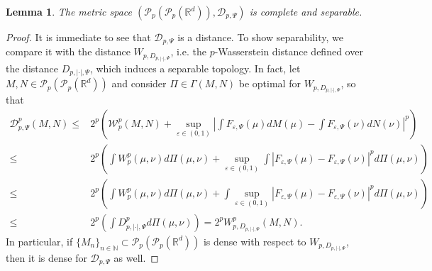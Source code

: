 \documentclass[10pt,leqno]{amsart}
\numberwithin{equation}{section}
\newtheorem{lemma}[teorema]{Lemma}
\newcommand{\R}{\mathbb{R}}
\newcommand{\N}{\mathbb{N}}
\newcommand{\PP}{\mathcal{P}}
\begin{document}
\begin{lemma}
    The metric space $(\PP_p(\PP_p(\R^d)),\mathcal{D}_{p,\Psi})$ is complete and separable.
\end{lemma}
\begin{proof}
    It is immediate to see that $\mathcal{D}_{p,\Psi} $ is a distance. To show separability, we compare it with the distance $W_{p,D_{p,|\cdot|,\Psi}}$, i.e. the $p$-Wasserstein distance defined over the distance $D_{p,|\cdot|,\Psi}$, which induces a separable topology. In fact, let $M,N\in \PP_p(\PP_p(\R^d))$ and consider $\Pi\in \Gamma(M,N)$ be optimal for $W_{p,D_{p,|\cdot|,\Psi}}$, so that 
    \begin{align*}
        \mathcal{D}_{p,\Psi}^p(M,N) \leq & 2^p\left( \mathcal{W}_p^p(M,N) + \sup_{\varepsilon\in(0,1)} \left|\int F_{\varepsilon,\Psi}(\mu) dM(\mu) - \int F_{\varepsilon,\Psi}(\nu) dN(\nu)\right|^p  \right)
        \\
        \leq & 2^p\left( \int W_p^p(\mu,\nu) d\Pi(\mu,\nu) + \sup_{\varepsilon\in(0,1)} \int \left|F_{\varepsilon,\Psi}(\mu) - F_{\varepsilon,\Psi}(\nu) \right|^p d\Pi(\mu,\nu) \right)
        \\
        \leq & 2^p\left( \int W_p^p(\mu,\nu) d\Pi(\mu,\nu) + \int \sup_{\varepsilon\in(0,1)}  \left|F_{\varepsilon,\Psi}(\mu) - F_{\varepsilon,\Psi}(\nu) \right|^p d\Pi(\mu,\nu) \right)
        \\
        \leq & 2^p \left( \int D_{p,|\cdot|,\Psi}^p d\Pi(\mu,\nu) \right) = 2^p W_{p,D_{p,|\cdot|,\Psi}}^p(M,N).
    \end{align*}
    In particular, if $\{M_n\}_{n\in \N} \subset \PP_p(\PP_p(\R^d))$ is dense with respect to $W_{p,D_{p,|\cdot|,\Psi}}$, then it is dense for $\mathcal{D}_{p,\Psi}$ as well.


\end{proof}
\end{document}

